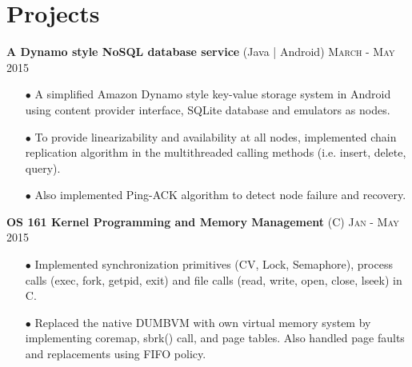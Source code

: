 \documentclass[letterpaper,11pt]{article}
\begin{document}
\section{Projects}





 \textbf{\normalsize{A Dynamo style NoSQL database service}} (Java | Android)
\hfill{\textsc{March - May 2015}}
{ 
\begin{itemize}\setlength{\itemsep}{-1pt}
 \item [$\bullet$] A simplified Amazon Dynamo style key-value storage system in Android using content provider interface, SQLite database and emulators as nodes.
  \item [$\bullet$] To provide linearizability and availability at all nodes, implemented chain replication algorithm in the multithreaded calling methods (i.e. insert, delete, query). 
   \item [$\bullet$] Also implemented Ping-ACK algorithm to detect node failure and recovery. 
\end{itemize}   
   }


 \textbf{\normalsize{OS 161 Kernel Programming and Memory Management}} (C)
\hfill{\textsc{Jan - May 2015}}


{ 
\begin{itemize}\setlength{\itemsep}{-1pt}
 \item [$\bullet$] Implemented synchronization primitives (CV, Lock, Semaphore), process calls (exec, fork, getpid, exit) and file calls (read, write, open, close, lseek) in C.
 \item [$\bullet$] Replaced the native DUMBVM with own virtual memory system by implementing coremap, sbrk() call, and page tables. Also handled page faults and replacements using FIFO policy.
\end{itemize}
   }
   
   
\end{document}
